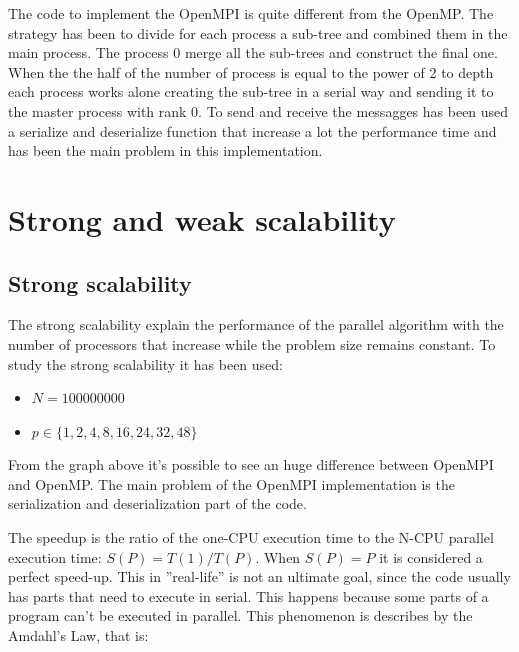 \documentclass[11pt,a4paper]{article}
\begin{document}
The code to implement the OpenMPI is quite different from the OpenMP. The strategy has been to divide for each process a sub-tree and combined them in the main process. The process 0 merge all the sub-trees and construct the final one. When the the half of the number of process is equal to the power of 2 to depth each process works alone creating the sub-tree in a serial way and sending it to the master process with rank 0. To send and receive the messagges has been used a serialize and deserialize function that increase a lot the performance time and has been the main problem in this implementation. 
\section{Strong and weak scalability}
\subsection{Strong scalability}
The strong scalability explain the performance of the parallel algorithm with the number of processors that increase while the problem size remains constant. To study the strong scalability it has been used:
\begin{itemize}
\item $N = 100000000$ 
\item $p \in \{1, 2, 4, 8, 16, 24, 32, 48\}$ 
\end{itemize}
From the graph above it's possible to see an huge difference between OpenMPI and OpenMP. The main problem of the OpenMPI implementation is the serialization and deserialization part of the code.  
\begin{figure}[H]
    \centering
\end{figure}
The speedup is the ratio of the one-CPU execution time to the N-CPU parallel execution time: $S(P) = T(1)/T(P)$. When $S(P) = P$ it is considered a perfect speed-up. This in ”real-life” is not an ultimate goal, since the code usually has parts that need to execute in serial.  This happens because some parts of a program can’t be executed in parallel. This phenomenon is describes by the Amdahl’s Law, that is:
\end{document}
